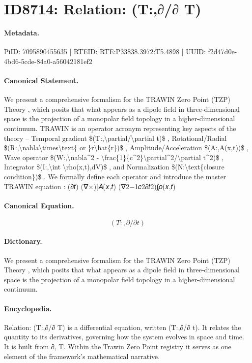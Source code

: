\section*{ID8714: Relation: (T:,∂/∂ T)}
\paragraph{Metadata.}
PiID: 7095890455635 | RTEID: RTE:P33838.3972:T5.4898 | UUID: f2d47d0e-4bd6-5cde-84a0-a56042181ef2

\paragraph{Canonical Statement.}
We present a comprehensive formalism for the TRAWIN Zero Point (TZP) Theory , which posits that what appears as a dipole field in three-dimensional space is the projection of a monopolar field topology in a higher-dimensional continuum. TRAWIN is an operator acronym representing key aspects of the theory – Temporal gradient \$(T:,\textbackslash{}partial/\textbackslash{}partial t)\$ , Rotational/Radial \$(R:,\textbackslash{}nabla\textbackslash{}times\textbackslash{}text\{ or \}r\textbackslash{}hat\{r\})\$ , Amplitude/Acceleration \$(A:,A(x,t))\$ , Wave operator \$(W:,\textbackslash{}nabla\textasciicircum{}2 - \textbackslash{}frac\{1\}\{c\textasciicircum{}2\}\textbackslash{}partial\textasciicircum{}2/\textbackslash{}partial t\textasciicircum{}2)\$ , Integrator \$(I:,\textbackslash{}int \textbackslash{}rho(x,t),dV)\$ , and Normalization \$(N:\textbackslash{}text\{closure condition\})\$ . We formally define each operator and introduce the master TRAWIN equation : (∂𝑡) (∇×)[𝐴(𝑥,𝑡) (∇2−1𝑐2∂𝑡2)∫𝜌(𝑥,𝑡)

\paragraph{Canonical Equation.}
\[
(T:,\partial/\partial t)
\]

\paragraph{Dictionary.}
We present a comprehensive formalism for the TRAWIN Zero Point (TZP) Theory , which posits that what appears as a dipole field in three-dimensional space is the projection of a monopolar field topology in a higher-dimensional continuum.

\paragraph{Encyclopedia.}
Relation: (T:,∂/∂ T) is a differential equation, written (T:,∂/∂ t). It relates the quantity to its derivatives, governing how the system evolves in space and time. It is built from ∂, T. Within the Trawin Zero Point registry it serves as one element of the framework's mathematical narrative.
